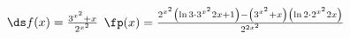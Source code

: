 {$\ds f(x) = \frac{3^{x^2}+x}{2^{x^2}}$
}
{$\fp(x) = \frac{2^{x^2}\left(\ln 3\cdot 3^{x^2}2x+1\right) - \left(3^{x^2}+x\right)\left(\ln 2\cdot 2^{x^2}2x\right)}{2^{2x^2}}$
}
